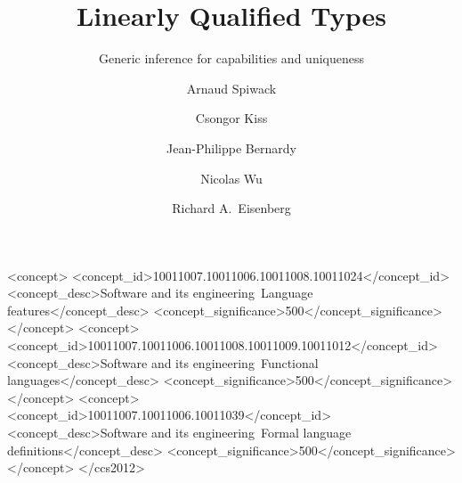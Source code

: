 \documentclass[acmsmall,usenames,dvipsnames,natbib=false,acmthm=false,screen]{acmart}
\newcommand{\Varid}[1]{\mathit{#1}}
\def\resethooks{%
  \global\let\SaveRestoreHook\empty
  \global\let\ColumnHook\empty}
\let\hspre\empty
\let\hspost\empty
\theoremstyle{acmplain}
\theoremstyle{acmdefinition}
\begin{document}
\title{Linearly Qualified Types}
\subtitle{Generic inference for capabilities and uniqueness}

\author{Arnaud Spiwack}
\author{Csongor Kiss}
\author{Jean-Philippe Bernardy}
\author{Nicolas Wu}
\author{Richard A.~Eisenberg}


\begin{CCSXML}\begin{hscode}\SaveRestoreHook
\column{B}{@{}>{\hspre}l<{\hspost}@{}}%
\column{E}{@{}>{\hspre}l<{\hspost}@{}}%
\>[B]{}\Varid{ccs2012}\mathbin{>}{}\<[E]%
\ColumnHook
\end{hscode}\resethooks
   <concept>
       <concept_id>10011007.10011006.10011008.10011024</concept_id>
       <concept_desc>Software and its engineering~Language features</concept_desc>
       <concept_significance>500</concept_significance>
       </concept>
   <concept>
       <concept_id>10011007.10011006.10011008.10011009.10011012</concept_id>
       <concept_desc>Software and its engineering~Functional languages</concept_desc>
       <concept_significance>500</concept_significance>
       </concept>
   <concept>
       <concept_id>10011007.10011006.10011039</concept_id>
       <concept_desc>Software and its engineering~Formal language definitions</concept_desc>
       <concept_significance>500</concept_significance>
       </concept>
 </ccs2012>
\end{CCSXML}

\end{document}
